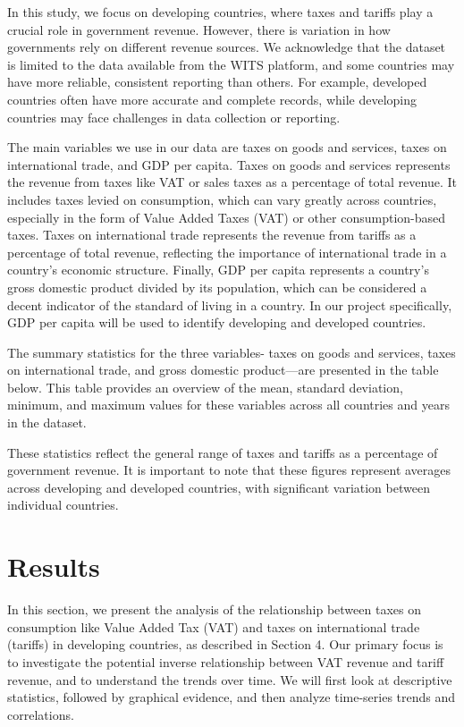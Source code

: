 \documentclass[12pt]{article}
\begin{document}
In this study, we focus on developing countries, where taxes and tariffs play a crucial role in government revenue. However, there is variation in how governments rely on different revenue sources. We acknowledge that the dataset is limited to the data available from the WITS platform, and some countries may have more reliable, consistent reporting than others. For example, developed countries often have more accurate and complete records, while developing countries may face challenges in data collection or reporting.

The main variables we use in our data are taxes on goods and services, taxes on international trade, and GDP per capita. Taxes on goods and services represents the revenue from taxes like VAT or sales taxes as a percentage of total revenue. It includes taxes levied on consumption, which can vary greatly across countries, especially in the form of Value Added Taxes (VAT) or other consumption-based taxes. Taxes on international trade represents the revenue from tariffs as a percentage of total revenue, reflecting the importance of international trade in a country's economic structure. Finally, GDP per capita represents a country's gross domestic product divided by its population, which can be considered a decent indicator of the standard of living in a country. In our project specifically, GDP per capita will be used to identify developing and developed countries. 

The summary statistics for the three variables- taxes on goods and services, taxes on international trade, and gross domestic product—are presented in the table below. This table provides an overview of the mean, standard deviation, minimum, and maximum values for these variables across all countries and years in the dataset.



These statistics reflect the general range of taxes and tariffs as a percentage of government revenue. It is important to note that these figures represent averages across developing and developed countries, with significant variation between individual countries.

\section{Results}
\label{sec:result}

In this section, we present the analysis of the relationship between taxes on consumption like Value Added Tax (VAT) and taxes on international trade (tariffs) in developing countries, as described in Section 4. Our primary focus is to investigate the potential inverse relationship between VAT revenue and tariff revenue, and to understand the trends over time. We will first look at descriptive statistics, followed by graphical evidence, and then analyze time-series trends and correlations. 
\end{document}
